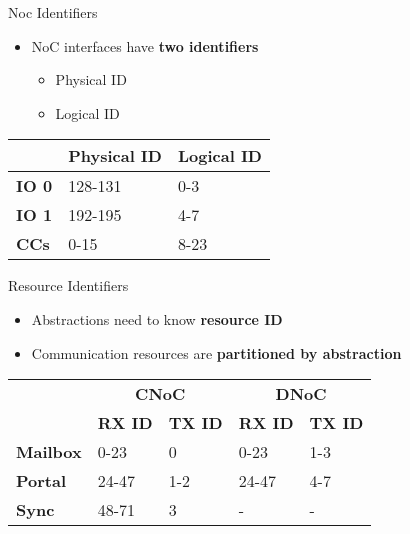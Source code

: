 		\begin{frame}[fragile]{Noc Identifiers}
			\begin{itemize}
				\item NoC interfaces have \textbf{two identifiers}
				\begin{itemize}
					\item Physical ID
					\item Logical ID
				\end{itemize}
			\end{itemize}

			\begin{table}
				\centering%
				\begin{tabular}{l|l|l|}
					\cline{2-3}
											            & \textbf{Physical ID} & \textbf{Logical ID} \\ \hline
					\multicolumn{1}{|l|}{\textbf{IO 0}} & 128-131              & 0-3                 \\ \hline
					\multicolumn{1}{|l|}{\textbf{IO 1}} & 192-195              & 4-7                 \\ \hline
					\multicolumn{1}{|l|}{\textbf{CCs}}  & 0-15                 & 8-23                \\ \hline
				\end{tabular}
			\end{table}
		\end{frame}

		\begin{frame}[fragile]{Resource Identifiers}
			\begin{itemize}
				\item Abstractions need to know \textbf{resource ID}
				\item Communication resources are \textbf{partitioned by abstraction}
			\end{itemize}

			\begin{table}[!tb]
				\centering%
				\begin{tabular}{l|l|l|l|l|}
					\cline{2-5}
														   & \multicolumn{2}{c|}{\textbf{CNoC}}               & \multicolumn{2}{c|}{\textbf{DNoC}}           \\ \cline{2-5}
														   & \textbf{RX ID} & \textbf{TX ID} & \textbf{RX ID} & \textbf{TX ID} \\ \hline
					\multicolumn{1}{|l|}{\textbf{Mailbox}} & 0-23           & 0              & 0-23           & 1-3            \\ \hline
					\multicolumn{1}{|l|}{\textbf{Portal}}  & 24-47          & 1-2            & 24-47          & 4-7            \\ \hline
					\multicolumn{1}{|l|}{\textbf{Sync}}    & 48-71          & 3              & -              & -              \\ \hline
				\end{tabular}
			\end{table}
		\end{frame}

